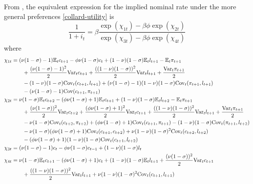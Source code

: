 From \cite{collard11}, the equivalent expression for the implied nominal rate under the more general preferences \eqref{collard-utility} is $$\frac{1}{1 + i_t} = \beta \frac{ \exp(\chi_{1t}) - \beta \phi \exp(\chi_{2t}) }{ \exp(\chi_{3t}) - \beta \phi \exp(\chi_{4t}) }$$ where
\begin{align*}
\chi_{1t} &= (\nu(1-\sigma)-1) \mathbb{E}_t c_{t+1} - \phi \nu(1-\sigma) c_t + (1-\nu)(1-\sigma) \mathbb{E}_t l_{t+1} - \mathbb{E}_t \pi_{t+1} \\
  &\qquad + \frac{(\nu(1-\sigma)-1)^2}{2} \mathrm{Var}_t c_{t+1} + \frac{((1-\nu)(1-\sigma))^2}{2} \mathrm{Var}_t l_{t+1} + \frac{\mathrm{Var}_t \pi_{t+1}}{2} \\
  &\qquad - (1-\nu)(1-\sigma) \mathrm{Cov}_t(c_{t+1}, l_{t+1}) + (\nu(1-\sigma)-1)(1-\nu)(1-\sigma) \mathrm{Cov}_t(\pi_{t+1}, l_{t+1}) \\
  &\qquad - (\nu(1-\sigma)-1) \mathrm{Cov}(c_{t+1}, \pi_{t+1}) \\
\chi_{2t} &= \nu(1-\sigma) \mathbb{E}_t c_{t+2} - (\phi\nu(1-\sigma)+1) \mathbb{E}_t c_{t+1} + (1-\nu)(1-\sigma) \mathbb{E}_t l_{t+2} - \mathbb{E}_t \pi_{t+1} \\
  &\qquad + \frac{(\nu(1-\sigma))^2}{2} \mathrm{Var}_t c_{t+2} + \frac{(\phi\nu(1-\sigma)+1)^2}{2} \mathrm{Var}_t c_{t+1} + \frac{((1-\nu)(1-\sigma))^2}{2} \mathrm{Var}_t l_{t+1} + \frac{\mathrm{Var}_t \pi_{t+1}}{2} \\
  &\qquad - \nu(1-\sigma) \mathrm{Cov}_t(c_{t+2}, \pi_{t+2}) + (\phi\nu(1-\sigma)+1) \mathrm{Cov}_t(c_{t+1}, \pi_{t+1}) - (1-\nu)(1-\sigma) \mathrm{Cov}_t(\pi_{t+1}, l_{t+2}) \\
  &\qquad - \nu(1-\sigma)(\phi\nu(1-\sigma)+1) \mathrm{Cov}_t(c_{t+1}, c_{t+2}) + \nu(1-\nu)(1-\sigma)^2 \mathrm{Cov}_t(c_{t+2}, l_{t+2}) \\
  &\qquad - (\phi\nu(1-\sigma)+1)(1-\nu)(1-\sigma) \mathrm{Cov}_t(c_{t+1}, l_{t+2}) \\
\chi_{3t} &= (\nu(1-\sigma)-1)c_t - \phi\nu(1-\sigma)c_{t-1} + (1-\nu)(1-\sigma)l_t \\
\chi_{4t} &= \nu(1-\sigma) \mathbb{E}_t c_{t+1} - (\phi\nu(1-\sigma)+1)c_t + (1-\nu)(1-\sigma) \mathbb{E}_t l_{t+1} + \frac{(\nu(1-\sigma))^2}{2} \mathrm{Var}_t c_{t+1} \\
  &\qquad + \frac{((1-\nu)(1-\sigma))^2}{2} \mathrm{Var}_t l_{t+1} + \nu(1-\nu)(1-\sigma)^2 \mathrm{Cov}_t(c_{t+1}, l_{t+1})
\end{align*}


